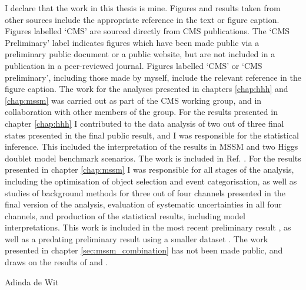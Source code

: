 \begin{declaration}
  \vspace*{1cm}
  I declare that the work in this thesis is mine. Figures and results taken from other sources
include the appropriate reference in the text or figure caption. Figures labelled `CMS' are sourced
directly from CMS publications. The `CMS Preliminary' label indicates figures which
have been made public via a preliminary public document or a public website, but are not
included in a publication in a peer-reviewed journal. Figures labelled `CMS' or `CMS preliminary', 
including those made by myself, include the relevant reference in the figure caption.
The work for the analyses presented in chapters \ref{chap:hhh} and \ref{chap:mssm} was 
carried out as part of the CMS \Htotautau working group, and in collaboration with other members of the group.
For the results presented in chapter \ref{chap:hhh} I contributed to the data analysis of two out of three
final states presented in the final public result, and I 
was responsible for the statistical inference. This included
the interpretation of the results in MSSM and two Higgs doublet model benchmark scenarios. The 
work is included in Ref. \cite{CMS-HIG-14-034}. For the results presented in chapter \ref{chap:mssm}
I was responsible for all stages of the analysis, including the optimisation
of object selection and event categorisation, as well as studies of background
methods for three out of four channels presented in the final version of the analysis,
evaluation of systematic uncertainties in all four channels, and production of the statistical
results, including model interpretations. This work is included in the most recent
preliminary result \cite{CMS-PAS-HIG-16-037}, as well as a predating preliminary
result using a smaller dataset \cite{CMS-PAS-HIG-16-006}.
The work presented in chapter \ref{sec:mssm_combination} has
not been made public, and draws on the results of \cite{CMS-PAS-HIG-16-037} and \cite{CMS-PAS-HIG-16-006}.

  \begin{flushright}
  Adinda de Wit
  \end{flushright}
\end{declaration}




\tableofcontents




\thispagestyle{empty}

